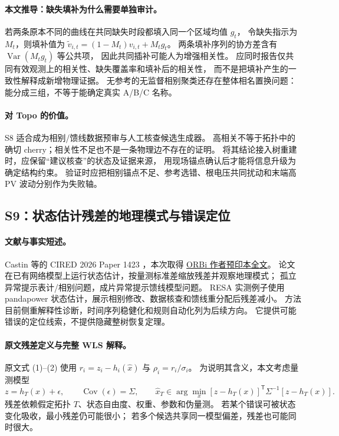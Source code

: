\paragraph{本文推导：缺失填补为什么需要单独审计。}
若两条原本不同的曲线在共同缺失时段都填入同一个区域均值 $g_t$，
令缺失指示为 $M_t$，则填补值为
$\widetilde v_{i,t}=(1-M_t)v_{i,t}+M_tg_t$。
两条填补序列的协方差含有 $\operatorname{Var}(M_tg_t)$ 等公共项，
因此共同插补可能人为增强相关性。
应同时报告仅共同有效观测上的相关性、缺失覆盖率和填补后的相关性，
而不是把填补产生的一致性解释成新增物理证据。
无参考的无监督相别聚类还存在整体相名置换问题：能分成三组，不等于能确定真实 A/B/C 名称。

\paragraph{对 Topo 的价值。}
S8 适合成为相别/馈线数据预审与人工核查候选生成器。
高相关不等于拓扑中的确切 cherry；相关性不足也不是一条物理边不存在的证明。
将其结论接入树重建时，应保留“建议核查”的状态及证据来源，
用现场锚点确认后才能将信息升级为确定结构约束。
验证时应把相别锚点不足、参考选错、根电压共同扰动和末端高 PV 波动分别作为失败轴。

\subsection{S9：状态估计残差的地理模式与错误定位}
\label{subsec:S9}

\paragraph{文献与事实短述。}
Castin 等的 CIRED 2026 Paper 1423 \citep{S9}，本次取得
\href{https://orbi.uliege.be/bitstream/2268/342287/1/Fullpaper_Theme2_1423_Castin.pdf}{ORBi 作者预印本全文}。
论文在已有网络模型上运行状态估计，按量测标准差缩放残差并观察地理模式；
孤立异常提示表计/相别问题，成片异常提示馈线模型问题。
RESA 实测例子使用 pandapower 状态估计，展示相别修改、数据核查和馈线重分配后残差减小。
方法目前侧重解释性诊断，时间序列稳健化和规则自动化列为后续方向。
它提供可能错误的定位线索，不提供隐藏整树恢复定理。

\paragraph{原文残差定义与完整 WLS 解释。}
原文式 (1)--(2) 使用 $r_i=z_i-h_i(\widehat x)$ 与 $\rho_i=r_i/\sigma_i$。
为说明其含义，本文考虑量测模型
\begin{equation}
 z=h_T(x)+\epsilon,\qquad \operatorname{Cov}(\epsilon)=\Sigma,
 \qquad
 \widehat x_T\in\arg\min_x
 [z-h_T(x)]^{\mathsf T}\Sigma^{-1}[z-h_T(x)].
 \label{eq:eng-s9-wls}
\end{equation}
残差依赖假定拓扑 $T$、状态自由度、权重、参数和伪量测。
若某个错误可被状态变化吸收，最小残差仍可能很小；
若多个候选共享同一模型偏差，残差也可能同时很大。

